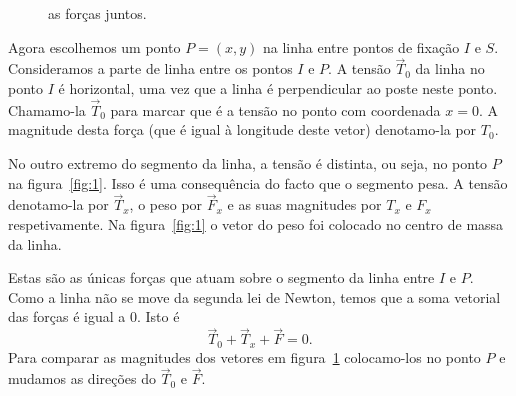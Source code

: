 \begin{figure}
  \vspace{-12pt}
  \begin{figurebox}
      \centering
  \caption{as forças juntos.}
  \label{fig:2}
  \end{figurebox}
  \vspace{-10pt}
\end{figure}

Agora escolhemos um ponto $P=(x,y)$ na linha entre pontos de fixação
$I$ e $S$. Consideramos a parte de linha entre os pontos $I$ e
$P$. A tensão $\vec{T}_0$ da linha no ponto $I$ é horizontal, uma vez
que a linha é perpendicular ao poste neste ponto. Chamamo-la
$\vec{T}_0$ para marcar que é a tensão no ponto com coordenada
$x=0$. A magnitude desta força (que é igual à longitude deste
vetor) denotamo-la por $T_0$.

No outro extremo do segmento da linha, a tensão é distinta, ou seja,
no ponto $P$ na figura~\ref{fig:1}. Isso é uma consequência do
facto que o segmento pesa. A tensão denotamo-la por $\vec{T}_x$, o
peso por $\vec{F}_x$ e as suas magnitudes por $T_x$ e $F_x$
respetivamente. Na figura~\ref{fig:1} o vetor do peso foi
colocado no centro de massa da linha.

Estas são as únicas forças que atuam sobre o segmento da linha entre
$I$ e $P$. Como a linha não se move da segunda lei de Newton,
temos que a soma vetorial das forças é igual a $0$. Isto é
\begin{displaymath}
  \vec{T}_0+\vec{T}_x+\vec{F}=0.
\end{displaymath}
Para comparar as magnitudes dos vetores em figura~\ref{fig:2}
colocamo-los no ponto $P$ e mudamos as direções do $\vec{T}_0$
e $\vec{F}$.


